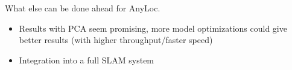 
What else can be done ahead for AnyLoc.

\begin{itemize}
    \item Results with PCA seem promising, more model optimizations could give better results (with higher throughput/faster speed)
    \item Integration into a full SLAM system
\end{itemize}
